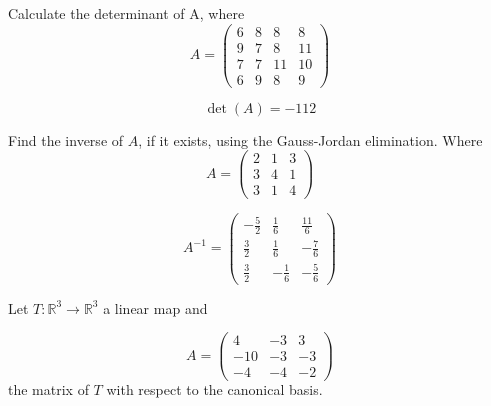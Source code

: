 \begin{questions}

\question Calculate the determinant of A, where
$$
A=\left(\begin{array}{rrrr}
6 & 8 & 8 & 8 \\
9 & 7 & 8 & 11 \\
7 & 7 & 11 & 10 \\
6 & 9 & 8 & 9
\end{array}\right)
$$

\begin{solution}
$$\det(A)=-112$$
\end{solution}

\question Find the inverse of $A$, if it exists, using the Gauss-Jordan elimination. Where
$$
A=\left(\begin{array}{rrr}
2 & 1 & 3 \\
3 & 4 & 1 \\
3 & 1 & 4
\end{array}\right)
$$

\begin{solution}
$$A^{-1}=\left(\begin{array}{rrr}
-\frac{5}{2} & \frac{1}{6} & \frac{11}{6} \\
\frac{3}{2} & \frac{1}{6} & -\frac{7}{6} \\
\frac{3}{2} & -\frac{1}{6} & -\frac{5}{6}
\end{array}\right)$$
\end{solution}

\question Let $T:\mathbb{R}^3\rightarrow\mathbb{R}^3$  a linear map and
 
$$
A=\left(\begin{array}{rrr}
4 & -3 & 3 \\
-10 & -3 & -3 \\
-4 & -4 & -2
\end{array}\right)
$$
the matrix of $T$ with respect to the canonical basis.
\end{questions}
